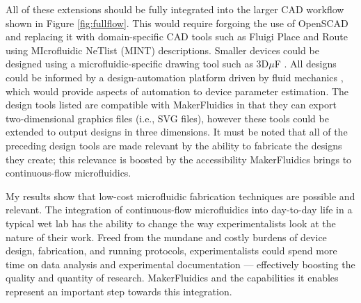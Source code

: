 All of these extensions should be fully integrated into the larger CAD workflow shown in Figure \ref{fig:fullflow}. This would require forgoing the use of OpenSCAD and replacing it with domain-specific CAD tools such as Fluigi Place and Route \cite{hu2014} using MIcrofluidic NeTlist (MINT) \cite{krishna2017iwbda} descriptions. Smaller devices could be designed using a microfluidic-specific drawing tool such as 3D$\mu$F \cite{lippai2017iwbda}. All designs could be informed by a design-automation platform driven by fluid mechanics \cite{ali2017iwbda}, which would provide aspects of automation to device parameter estimation. The design tools listed are compatible with MakerFluidics in that they can export two-dimensional graphics files (i.e., SVG files), however these tools could be extended to output designs in three dimensions. It must be noted that all of the preceding design tools are made relevant by the ability to fabricate the designs they create; this relevance is boosted by the accessibility MakerFluidics brings to continuous-flow microfluidics.


My results show that low-cost microfluidic fabrication techniques are possible and relevant. The integration of continuous-flow microfluidics into day-to-day life in a typical wet lab has the ability to change the way experimentalists look at the nature of their work. Freed from the mundane and costly burdens of device design, fabrication, and running protocols, experimentalists could spend more time on data analysis and experimental documentation --- effectively boosting the quality and quantity of research. MakerFluidics and the capabilities it enables represent an important step towards this integration.
